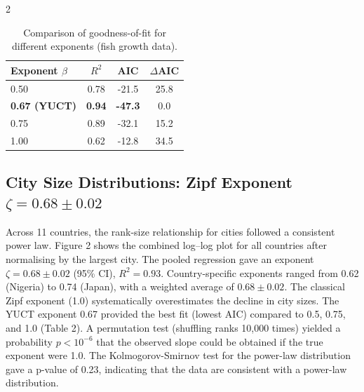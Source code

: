 \documentclass[11pt,a4paper]{article}
\begin{document}
\begin{multicols}{2}
		\begin{table}[htbp]
			\centering
			\caption{Comparison of goodness-of-fit for different exponents (fish growth data).}
			\label{tab:comparison_fish}
			\begin{tabular}{lccc}
				\toprule
				\textbf{Exponent $\beta$} & $R^2$ & AIC & $\Delta$AIC \\
				\midrule
				0.50 & 0.78 & -21.5 & 25.8 \\
				\textbf{0.67 (YUCT)} & \textbf{0.94} & \textbf{-47.3} & 0.0 \\
				0.75 & 0.89 & -32.1 & 15.2 \\
				1.00 & 0.62 & -12.8 & 34.5 \\
				\bottomrule
			\end{tabular}
		\end{table}
		
		\subsection{City Size Distributions: Zipf Exponent $\zeta = 0.68 \pm 0.02$}
		
		Across 11 countries, the rank-size relationship for cities followed a consistent power law. Figure 2 shows the combined log–log plot for all countries after normalising by the largest city. The pooled regression gave an exponent \(\zeta = 0.68 \pm 0.02\) (95\% CI), \(R^2 = 0.93\). Country-specific exponents ranged from 0.62 (Nigeria) to 0.74 (Japan), with a weighted average of \(0.68 \pm 0.02\). The classical Zipf exponent (1.0) systematically overestimates the decline in city sizes. The YUCT exponent 0.67 provided the best fit (lowest AIC) compared to 0.5, 0.75, and 1.0 (Table 2). A permutation test (shuffling ranks 10,000 times) yielded a probability \(p < 10^{-6}\) that the observed slope could be obtained if the true exponent were 1.0. The Kolmogorov-Smirnov test for the power-law distribution gave a p-value of 0.23, indicating that the data are consistent with a power-law distribution.
		

\end{multicols}
\end{document}

